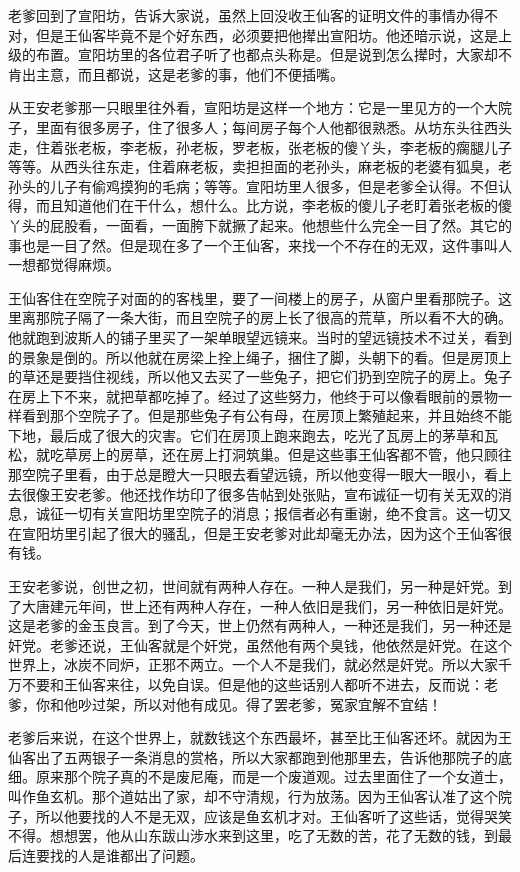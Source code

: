 老爹回到了宣阳坊，告诉大家说，虽然上回没收王仙客的证明文件的事情办得不对，但是王仙客毕竟不是个好东西，必须要把他撵出宣阳坊。他还暗示说，这是上级的布置。宣阳坊里的各位君子听了也都点头称是。但是说到怎么撵时，大家却不肯出主意，而且都说，这是老爹的事，他们不便插嘴。 

从王安老爹那一只眼里往外看，宣阳坊是这样一个地方：它是一里见方的一个大院子，里面有很多房子，住了很多人；每间房子每个人他都很熟悉。从坊东头往西头走，住着张老板，李老板，孙老板，罗老板，张老板的傻丫头，李老板的瘸腿儿子等等。从西头往东走，住着麻老板，卖担担面的老孙头，麻老板的老婆有狐臭，老孙头的儿子有偷鸡摸狗的毛病；等等。宣阳坊里人很多，但是老爹全认得。不但认得，而且知道他们在干什么，想什么。比方说，李老板的傻儿子老盯着张老板的傻丫头的屁股看，一面看，一面胯下就撅了起来。他想些什么完全一目了然。其它的事也是一目了然。但是现在多了一个王仙客，来找一个不存在的无双，这件事叫人一想都觉得麻烦。 

王仙客住在空院子对面的的客栈里，要了一间楼上的房子，从窗户里看那院子。这里离那院子隔了一条大街，而且空院子的房上长了很高的荒草，所以看不大的确。他就跑到波斯人的铺子里买了一架单眼望远镜来。当时的望远镜技术不过关，看到的景象是倒的。所以他就在房梁上拴上绳子，捆住了脚，头朝下的看。但是房顶上的草还是要挡住视线，所以他又去买了一些兔子，把它们扔到空院子的房上。兔子在房上下不来，就把草都吃掉了。经过了这些努力，他终于可以像看眼前的景物一样看到那个空院子了。但是那些兔子有公有母，在房顶上繁殖起来，并且始终不能下地，最后成了很大的灾害。它们在房顶上跑来跑去，吃光了瓦房上的茅草和瓦松，就吃草房上的房草，还在房上打洞筑巢。但是这些事王仙客都不管，他只顾往那空院子里看，由于总是瞪大一只眼去看望远镜，所以他变得一眼大一眼小，看上去很像王安老爹。他还找作坊印了很多告帖到处张贴，宣布诚征一切有关无双的消息，诚征一切有关宣阳坊里空院子的消息；报信者必有重谢，绝不食言。这一切又在宣阳坊里引起了很大的骚乱，但是王安老爹对此却毫无办法，因为这个王仙客很有钱。 

王安老爹说，创世之初，世间就有两种人存在。一种人是我们，另一种是奸党。到了大唐建元年间，世上还有两种人存在，一种人依旧是我们，另一种依旧是奸党。这是老爹的金玉良言。到了今天，世上仍然有两种人，一种还是我们，另一种还是奸党。老爹还说，王仙客就是个奸党，虽然他有两个臭钱，他依然是奸党。在这个世界上，冰炭不同炉，正邪不两立。一个人不是我们，就必然是奸党。所以大家千万不要和王仙客来往，以免自误。但是他的这些话别人都听不进去，反而说：老爹，你和他吵过架，所以对他有成见。得了罢老爹，冤家宜解不宜结！ 

老爹后来说，在这个世界上，就数钱这个东西最坏，甚至比王仙客还坏。就因为王仙客出了五两银子一条消息的赏格，所以大家都跑到他那里去，告诉他那院子的底细。原来那个院子真的不是废尼庵，而是一个废道观。过去里面住了一个女道士，叫作鱼玄机。那个道姑出了家，却不守清规，行为放荡。因为王仙客认准了这个院子，所以他要找的人不是无双，应该是鱼玄机才对。王仙客听了这些话，觉得哭笑不得。想想罢，他从山东跋山涉水来到这里，吃了无数的苦，花了无数的钱，到最后连要找的人是谁都出了问题。 

